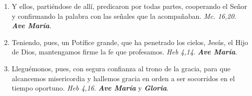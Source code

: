 \documentclass[../../devocionario.tex]{subfiles}
\begin{document}
\begin{enumerate}
        \item Y ellos, partiéndose de allí, predicaron por todas partes, cooperando el Señor y confirmando la palabra con las señales que la acompañaban. 
            \textit{Mc. 16,20}. \textbf{\textit{Ave María}}.

        \item Teniendo, pues, un Potífice grande, que ha penetrado los cielos, Jesús, el Hijo de Dios, mantengamos firme la fe que profesamos. 
            \textit{Heb 4,14}. \textbf{\textit{Ave María}}.

        \item Lleguémonos, pues, con segura confianza al trono de la gracia, para que alcancemos misericordia y hallemos gracia en orden a ser socorridos en el tiempo oportuno. 
            \textit{Heb 4,16}. \textbf{\textit{Ave María}} y \textbf{\textit{Gloria}}.

    \end{enumerate}
\end{document}
